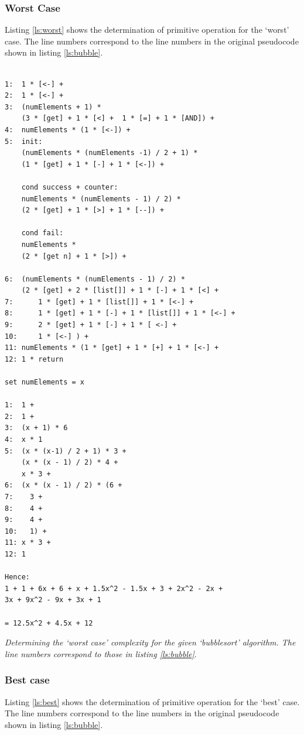 \documentclass[a4paper,11pt,twoside]{article}
\begin{document}
\subsubsection{Worst Case}
Listing \ref{ls:worst} shows the determination of primitive operation
for the `worst' case. The line numbers correspond to the line numbers
in the original pseudocode shown in listing \ref{ls:bubble}.

\begin{listing}
\begin{verbatim}

1:  1 * [<-] + 
2:  1 * [<-] + 
3:  (numElements + 1) * 
    (3 * [get] + 1 * [<] +  1 * [=] + 1 * [AND]) + 
4:  numElements * (1 * [<-]) +
5:  init:
    (numElements * (numElements -1) / 2 + 1) *
    (1 * [get] + 1 * [-] + 1 * [<-]) +
 
    cond success + counter: 
    numElements * (numElements - 1) / 2) *
    (2 * [get] + 1 * [>] + 1 * [--]) +

    cond fail:
    numElements * 
    (2 * [get n] + 1 * [>]) +

6:  (numElements * (numElements - 1) / 2) * 
    (2 * [get] + 2 * [list[]] + 1 * [-] + 1 * [<] + 
7:      1 * [get] + 1 * [list[]] + 1 * [<-] +
8:      1 * [get] + 1 * [-] + 1 * [list[]] + 1 * [<-] + 
9:      2 * [get] + 1 * [-] + 1 * [ <-] +
10:     1 * [<-] ) +
11: numElements * (1 * [get] + 1 * [+] + 1 * [<-] +
12: 1 * return

set numElements = x

1:  1 + 
2:  1 + 
3:  (x + 1) * 6  
4:  x * 1
5:  (x * (x-1) / 2 + 1) * 3 +
    (x * (x - 1) / 2) * 4 +
    x * 3 +
6:  (x * (x - 1) / 2) * (6 +
7:    3 + 
8:    4 +
9:    4 + 
10:   1) + 
11: x * 3 +
12: 1 

Hence:
1 + 1 + 6x + 6 + x + 1.5x^2 - 1.5x + 3 + 2x^2 - 2x + 
3x + 9x^2 - 9x + 3x + 1

= 12.5x^2 + 4.5x + 12

\end{verbatim}
\caption{\textit{Determining the `worst case' complexity for the given
    `bubblesort' algorithm. The line numbers correspond to those in 
listing \ref{ls:bubble}}.\label{ls:worst}}
\end{listing}

\subsubsection{Best case}
Listing \ref{ls:best} shows the determination of primitive operation
for the `best' case. The line numbers correspond to the line numbers
in the original pseudocode shown in listing \ref{ls:bubble}.
\end{document}
